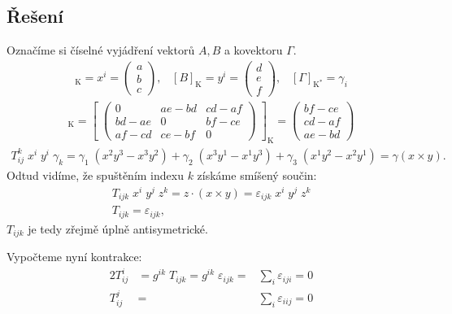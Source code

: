 \documentclass[]{article}
\begin{document}
\subsection{Řešení}
Označíme si číselné vyjádření vektorů $A,B$ a kovektoru $\Gamma$.
\begin{align*}
    [A]_\mathrm{K} = x^i = \begin{pmatrix}
        a \\ b \\ c
    \end{pmatrix}, \;\;\;
    [B]_\mathrm{K} = y^i = \begin{pmatrix}
        d \\ e \\ f
    \end{pmatrix}, \;\;\;
    [\Gamma]_\mathrm{K^*} = \gamma_i
\end{align*}
\begin{align*}
    [AB - BA]_\mathrm{K} =
    \left[ \;
    \begin{pmatrix}
        0 & ae-bd & cd-af \\
        bd-ae & 0 & bf-ce \\
        af-cd & ce-bf & 0
    \end{pmatrix} \;
    \right]_\mathrm{K}
    =
    \begin{pmatrix}
        bf-ce \\ cd-af \\ ae-bd
    \end{pmatrix}
\end{align*}
\begin{align*}
    T_{ij}^k \; x^i \; y^i \; \gamma_k
    = \gamma_1 \; (x^2 y^3 - x^3 y^2)
    + \gamma_2 \; (x^3 y^1 - x^1 y^3)
    + \gamma_3 \; (x^1 y^2 - x^2 y^1)
    = \gamma (x \times y).
\end{align*}
Odtud vidíme, že spuštěním indexu $k$ získáme smíšený součin:
\begin{gather*}
    T_{ijk} \; x^i \; y^j \; z^k
    = z \cdot (x \times y)
    = \varepsilon_{ijk} \; x^i \; y^j \; z^k
    \\
    T_{ijk} = \varepsilon_{ijk},
\end{gather*}
$T_{ijk}$ je tedy zřejmě úplně antisymetrické.

\bigskip

Vypočteme nyní kontrakce:
\begin{alignat*}{2}
    T_{ij}^i &= g^{ik} \; T_{ijk}
    = g^{ik} \; \varepsilon_{ijk}
    = &\sum_i \varepsilon_{iji}
    = 0
    \\
    T_{ij}^j &=
    &\sum_i \varepsilon_{iij}
    = 0
\end{alignat*}
\end{document}

